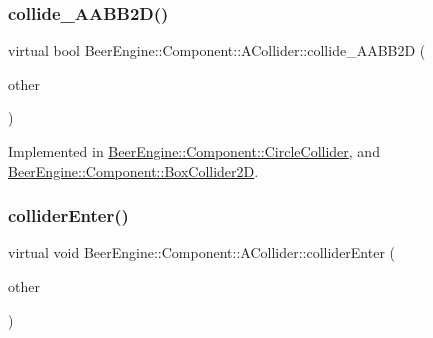 \subsubsection{\texorpdfstring{collide\+\_\+\+A\+A\+B\+B2\+D()}{collide\_AABB2D()}\hspace{0.1cm}{\footnotesize\ttfamily [2/2]}}
{\footnotesize\ttfamily virtual bool Beer\+Engine\+::\+Component\+::\+A\+Collider\+::collide\+\_\+\+A\+A\+B\+B2D (\begin{DoxyParamCaption}\item[{\mbox{\hyperlink{class_beer_engine_1_1_component_1_1_box_collider2_d}{Box\+Collider2D}} $\ast$}]{other }\end{DoxyParamCaption})\hspace{0.3cm}{\ttfamily [pure virtual]}}



Implemented in \mbox{\hyperlink{class_beer_engine_1_1_component_1_1_circle_collider_a9e88d5908734005d0141a75b8b02fd78}{Beer\+Engine\+::\+Component\+::\+Circle\+Collider}}, and \mbox{\hyperlink{class_beer_engine_1_1_component_1_1_box_collider2_d_a2b6af1325c64867d59cb11655c41a262}{Beer\+Engine\+::\+Component\+::\+Box\+Collider2D}}.

\mbox{\label{class_beer_engine_1_1_component_1_1_a_collider_afa37b41af82346916f1f4f6d0956d2c0}} 
\subsubsection{\texorpdfstring{collider\+Enter()}{colliderEnter()}}
{\footnotesize\ttfamily virtual void Beer\+Engine\+::\+Component\+::\+A\+Collider\+::collider\+Enter (\begin{DoxyParamCaption}\item[{\mbox{\hyperlink{class_beer_engine_1_1_component_1_1_a_collider}{A\+Collider}} $\ast$}]{other }\end{DoxyParamCaption})\hspace{0.3cm}{\ttfamily [virtual]}}

\mbox{\label{class_beer_engine_1_1_component_1_1_a_collider_a6446f7f796c3a7f619c7c1ef774502b7}} 
